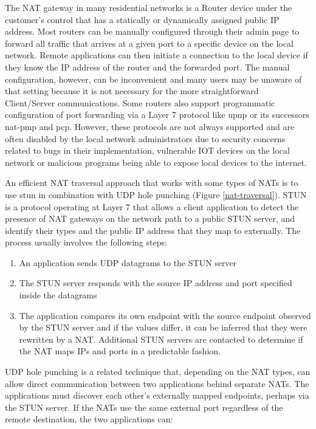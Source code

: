 The NAT gateway in many residential networks is a Router device under
the customer's control that has a statically or dynamically assigned
public IP address. Most routers can be manually configured through their
admin page to forward all traffic that arrives at a given port to a
specific device on the local network. Remote applications can then
initiate a connection to the local device if they know the IP address of
the router and the forwarded port. The manual configuration, however,
can be inconvenient and many users may be unaware of that setting
because it is not necessary for the more straightforward Client/Server
communications. Some routers also support programmatic configuration of
port forwarding via a Layer 7 protocol like \gls{upnp} or its successors
\gls{nat-pmp} and \gls{pcp}. However, these protocols are not always
supported and are often disabled by the local network administrators due
to security concerns related to bugs in their implementation, vulnerable
IOT devices on the local network or malicious programs being able to
expose local devices to the internet.


An efficient NAT traversal approach that works with some types of NATs
is to use \gls{stun} \autocite{stunRFC} in combination with UDP hole
punching (Figure \ref{nat-traversal}). STUN is a protocol operating at
Layer 7 that allows a client application to detect the presence of NAT
gateways on the network path to a public STUN server, and identify their
types and the public IP address that they map to externally. The process
usually involves the following steps:

\begin{enumerate}
\def\labelenumi{\arabic{enumi}.}
\tightlist
\item
  An application sends UDP datagrams to the STUN server
\item
  The STUN server responds with the source IP address and port specified
  inside the datagrams
\item
  The application compares its own endpoint with the source endpoint
  observed by the STUN server and if the values differ, it can be
  inferred that they were rewritten by a NAT. Additional STUN servers
  are contacted to determine if the NAT maps IPs and ports in a
  predictable fashion.
\end{enumerate}

UDP hole punching is a related technique that, depending on the NAT
types, can allow direct communication between two applications behind
separate NATs. The applications must discover each other's externally
mapped endpoints, perhaps via the STUN server.  If the
NATs use the same external port regardless of the remote destination,
the two applications can:


